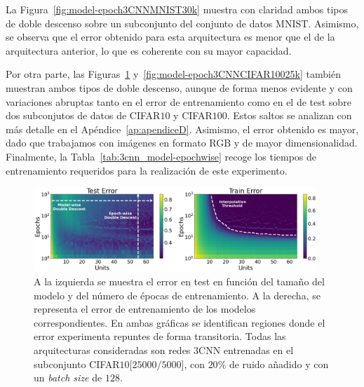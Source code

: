 La Figura~\ref{fig:model-epoch3CNNMNIST30k} muestra con claridad ambos tipos de doble descenso sobre un subconjunto del conjunto de datos MNIST. Asimismo, se observa que el error obtenido para esta arquitectura es menor que el de la arquitectura anterior, lo que es coherente con su mayor capacidad.

Por otra parte, las Figuras~\ref{fig:model-epoch3CNNCIFAR10} y~\ref{fig:model-epoch3CNNCIFAR10025k} también muestran ambos tipos de doble descenso, aunque de forma menos evidente y con variaciones abruptas tanto en el error de entrenamiento como en el de test sobre dos subconjutos de datos de CIFAR$10$ y CIFAR$100$. Estos saltos se analizan con más detalle en el Apéndice~\ref{ap:apendiceD}. Asimismo, el error obtenido es mayor, dado que trabajamos con imágenes en formato RGB y de mayor dimensionalidad. Finalmente, la Tabla~\ref{tab:3cnn_model-epochwise} recoge los tiempos de entrenamiento requeridos para la realización de este experimento.

\begin{figure}[h]
    \centering
    \includegraphics[width=0.95\textwidth]{img/experiments/model-epoch3CNNCIFAR1025k.png}
    \caption[Doble descenso en función del tamaño del modelo y del número de épocas para la red $3$CNN y un subconjunto de CIFAR$10$.]{A la izquierda se muestra el error en test en función del tamaño del modelo y del número de épocas de entrenamiento. A la derecha, se representa el error de entrenamiento de los modelos correspondientes. En ambas gráficas se identifican regiones donde el error experimenta repuntes de forma transitoria. Todas las arquitecturas consideradas son redes $3$CNN entrenadas en el subconjunto CIFAR$10$[$25000/5000$], con $20\%$ de ruido añadido y con un \textit{batch size} de $128$.}\label{fig:model-epoch3CNNCIFAR10}
\end{figure}

